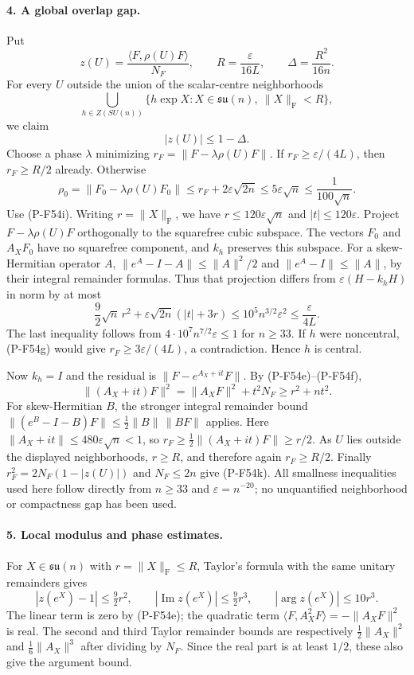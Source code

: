\paragraph{4. A global overlap gap.}
Put
\[
 z(U)=\frac{\langle F,\rho(U)F\rangle}{N_F},
 \qquad R=\frac{\varepsilon}{16L},
 \qquad \Delta=\frac{R^2}{16n}.
                                                               \tag{P-F54j}
\]
For every $U$ outside the union of the scalar-centre neighborhoods
\[
  \bigcup_{h\in Z(SU(n))}
       \{h\exp X:X\in\mathfrak{su}(n),\ \|X\|_{\mathrm F}<R\},
\]
we claim
\[
                            |z(U)|\le1-\Delta.               \tag{P-F54k}
\]
Choose a phase $\lambda$ minimizing
$r_F=\|F-\lambda\rho(U)F\|$.
If $r_F\ge\varepsilon/(4L)$, then $r_F\ge R/2$ already.
Otherwise
\[
 \rho_0=\|F_0-\lambda\rho(U)F_0\|
       \le r_F+2\varepsilon\sqrt{2n}
       \le5\varepsilon\sqrt n\le\frac1{100\sqrt n}.
\]
Use (P-F54i). Writing $r=\|X\|_{\mathrm F}$, we have
$r\le120\varepsilon\sqrt n$ and $|t|\le120\varepsilon$.
Project $F-\lambda\rho(U)F$ orthogonally to the squarefree
cubic subspace. The vectors $F_0$ and $A_XF_0$ have no
squarefree component, and $k_h$ preserves this subspace.
For a skew-Hermitian operator $A$,
$\|e^A-I-A\|\le\|A\|^2/2$ and
$\|e^A-I\|\le\|A\|$, by their integral remainder formulas.
Thus that projection differs from
$\varepsilon(H-k_hH)$ in norm by at most
\[
 \frac92\sqrt n\,r^2
    +\varepsilon\sqrt{2n}(|t|+3r)
 \le10^5n^{3/2}\varepsilon^2
 \le\frac{\varepsilon}{4L}.                                 \tag{P-F54l}
\]
The last inequality follows from
$4\cdot10^7 n^{7/2}\varepsilon\le1$ for $n\ge33$.
If $h$ were noncentral, (P-F54g) would give
$r_F\ge3\varepsilon/(4L)$, a contradiction.
Hence $h$ is central.

Now $k_h=I$ and the residual is
$\|F-e^{A_X+it}F\|$.
By (P-F54e)--(P-F54f),
\[
       \|(A_X+it)F\|^2
            =\|A_XF\|^2+t^2N_F\ge r^2+nt^2.
\]
For skew-Hermitian $B$, the stronger integral remainder bound
$\|(e^B-I-B)F\|\le\frac12\|B\|\,\|BF\|$ applies.
Here $\|A_X+it\|\le480\varepsilon\sqrt n<1$, so
$r_F\ge\frac12\|(A_X+it)F\|\ge r/2$.
As $U$ lies outside the displayed neighborhoods, $r\ge R$,
and therefore again $r_F\ge R/2$.
Finally
$r_F^2=2N_F(1-|z(U)|)$ and $N_F\le2n$ give
(P-F54k). All smallness inequalities used here follow directly
from $n\ge33$ and $\varepsilon=n^{-20}$; no unquantified
neighborhood or compactness gap has been used.

\paragraph{5. Local modulus and phase estimates.}
For $X\in\mathfrak{su}(n)$ with $r=\|X\|_{\mathrm F}\le R$,
Taylor's formula with the same unitary remainders gives
\[
 |z(e^X)-1|\le\tfrac92 r^2,
 \qquad |\operatorname{Im}z(e^X)|\le\tfrac92 r^3,
 \qquad |\arg z(e^X)|\le10r^3.                               \tag{P-F54m}
\]
The linear term is zero by (P-F54e); the quadratic term
$\langle F,A_X^2F\rangle=-\|A_XF\|^2$ is real.
The second and third Taylor remainder bounds are respectively
$\frac12\|A_X\|^2$ and $\frac16\|A_X\|^3$ after dividing
by $N_F$. Since the real part is at least $1/2$, these also
give the argument bound.

